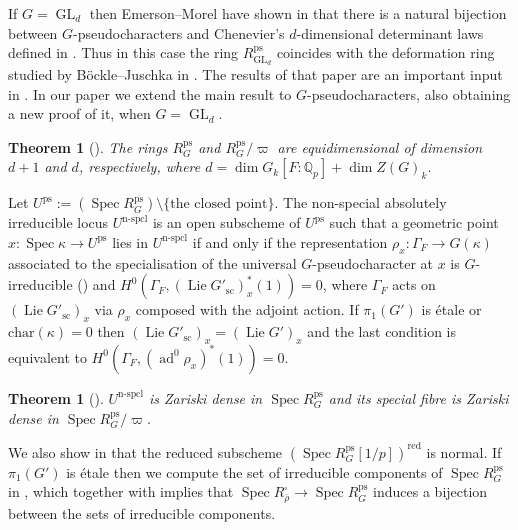 \documentclass{amsart}
\newtheorem{thm}[prop]{Theorem}
\theoremstyle{definition}
\theoremstyle{remark}
\DeclareMathOperator{\GL}{GL}
\DeclareMathOperator{\Spec}{Spec}
\newcommand{\Qp}{\mathbb {Q}_p}
\DeclareMathOperator{\ad}{ad}
\newcommand{\rhobar}{\overline{\rho}}
\newcommand{\ps}{\mathrm{ps}}
\newcommand{\red}{\mathrm{red}}
\DeclareMathOperator{\nspcl}{n-spcl}
\DeclareMathOperator{\Lie}{Lie}
\newcommand{\chara}{\mathrm{char}}
\newcommand{\sic}{\operatorname{sc}}
\begin{document}
If $G=\GL_d$ then Emerson--Morel have shown in \cite{emerson2023comparison} that there is a natural bijection between  $G$-pseudocharacters and
Chenevier's $d$-dimensional determinant laws defined in \cite{che_durham}. Thus in this case the ring $R^{\ps}_{\GL_d}$ coincides with the deformation ring studied 
by B\"ockle--Juschka in \cite{BJ_new}. The results of that paper are an important input in \cite{BIP_new}. In our paper we extend 
the main result \cite[Theorem 5.5.1]{BJ_new} to $G$-pseudocharacters, also obtaining a new proof of it, when $G=\GL_d$.

\begin{thm}[] The rings $R^{\ps}_G$ and $R^{\ps}_G/\varpi$ are equidimensional of dimension $d+1$ and $d$, respectively, where $d= \dim G_k [F:\Qp] + \dim Z(G)_k$. 
\end{thm} 

Let $U^{\ps}:=(\Spec R^{\ps}_G)\setminus \{\text{the closed point}\}$. The non-special absolutely irreducible locus $U^{\nspcl}$ is 
an open subscheme of $U^{\ps}$ such that a geometric point $x:\Spec \kappa\rightarrow U^{\ps}$ lies in $U^{\nspcl}$ if and only if the representation 
$\rho_x: \Gamma_F \rightarrow G(\kappa)$ associated to the specialisation of the universal $G$-pseudocharacter at $x$ is 
$G$-irreducible () and $H^0(\Gamma_F, (\Lie G'_{\sic})_{x}^*(1))=0$, where $\Gamma_F$ acts on $(\Lie G'_{\sic})_x$ via $\rho_x$ composed with the adjoint action. 
If $\pi_1(G')$ is \'etale or $\chara(\kappa)=0$ then 
$(\Lie G'_{\sic})_x=(\Lie G')_x$ and the 
last condition is equivalent to $H^0(\Gamma_F, (\ad^0 \rho_x)^*(1))=0$.

\begin{thm}[] $U^{\nspcl}$ is Zariski dense in $\Spec R^{\ps}_G$ and its special fibre is Zariski dense in $\Spec R^{\ps}_G/\varpi$.
\end{thm}

We also show in  that the reduced subscheme $(\Spec R^{\ps}_G[1/p])^{\red}$  is normal. If $\pi_1(G')$ is \'etale then we
 compute the set of irreducible
components of $\Spec R^{\ps}_G$ in , which together with  implies that 
$\Spec R^{\square}_{\rhobar}\rightarrow \Spec R^{\ps}_G$ induces a bijection between the sets of irreducible components.
\end{document}

